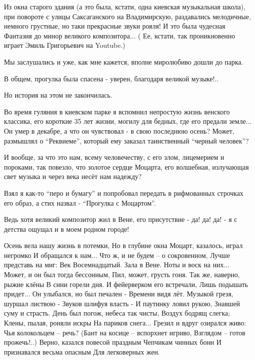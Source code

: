Из окна старого здания (а это была, кстати, одна киевская музыкальная школа),
при повороте с улицы Саксаганского на Владимирскую, раздавались мелодичные,
немного грустные, но таки прекрасные звуки рояля! И это была чудесная Фантазия
до минор великого композитора... ( Ее, кстати, так проникновенно играет Эмиль
Григорьевич на Youtube.) 

Мы заслушались и уже, как мне кажется, вполне миролюбиво дошли до парка.

В общем, прогулка была спасена - уверен, благодаря великой музыке!..

Но история на этом не закончилась.

Во время гуляния в киевском парке я вспомнил непростую жизнь венского классика,
его короткие 35 лет жизни, могилу для бедных, где его предали земле... Он умер
в декабре, а что он чувствовал - в свою последнюю осень? Может, размышлял о
\enquote{Реквиеме},  который ему заказал таинственный \enquote{черный человек}?

И вообще, за что это нам, всему человечеству, с его злом, лицемерием и
пороками, так повезло, что золотое сердце Моцарта, его волшебная, излучающая
свет музыка и через века несёт нам надежду?

Взял я как-то \enquote{перо и бумагу} и попробовал передать в рифмованных
строчках его образ, а стих назвал - \enquote{Прогулка с Моцартом}.

Ведь хотя великий композитор жил в Вене, его присутствие - да! да! да! - я с
детства ощущал и в моем родном городе!


\begin{multicols}{2}
\setlength{\parindent}{0pt}
\obeycr
Осень вела нашу жизнь в потемки, 
Но в глубине окна 
Моцарт, казалось, играл негромко 
И обращался к нам... 
\smallskip
Что ж, и не будем – о сокровенном, 
Лучше представь на миг: 
Век Восемнадцатый. Зала в Вене. 
Ноты и воск на них... 
\smallskip
Может, и он был тогда бессонным, 
Пил, может, грусть гоня. 
Так же, наверно, рыжие клёны 
В сини горели дня. 
\smallskip
И фейерверком его встречали, 
Лишь подышать придет... 
Он улыбался, но был печален - 
Времени видя лёт. 
\smallskip
Музыкой грезя, шуршал листвою  -
Звуков шлифуя власть -
И паутинку ловил рукою, 
Знавшей суму и страсть. 
\smallskip
День был погож, небеса так чисты, 
Воздух бодрящ слегка; 
Клены, пылая, роняли искры 
На париков снега... 
\smallskip
Грезил и вдруг озирался живо: 
Чья колокольцем – речь? 
(Бант на косице – вспорхнет игриво,
Взглядом – готов прожечь!..) 
\smallskip
Верно, казался повесой праздным
Чепчикам чинных бонн 
И признавался весьма опасным 
Для легковерных жен.
\restorecr
\end{multicols}


